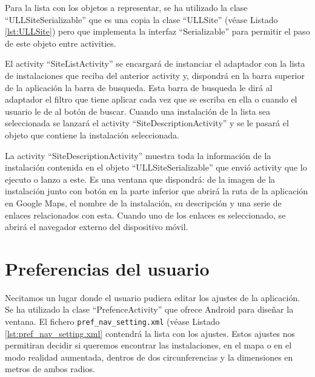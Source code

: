 

Para la lista con los objetos a representar, se ha utilizado la clase ``ULLSiteSerializable'' que es una copia la clase  ``ULLSite'' (véase Listado \ref{lst:ULLSite}) pero que implementa la interfaz ``Serializable'' para permitir el paso de este objeto entre activities. 

El activity ``SiteListActivity'' se encargará de instanciar el adaptador con la lista de instalaciones que reciba del anterior activity y, dispondrá en la barra superior de la aplicación la barra de busqueda. Esta barra de busqueda le dirá al adaptador el filtro que tiene aplicar cada vez que se escriba en ella o cuando el usuario le de al botón de buscar. Cuando una instalación de la lista sea seleccionada se lanzará el activity ``SiteDescriptionActivity'' y se le pasará el objeto que contiene la instalación seleccionada.


    

La activity ``SiteDescriptionActivity'' muestra toda la información de la instalación contenida en el objeto ``ULLSiteSerializable'' que envió activity que lo ejecuto o lanzo a este. Es una ventana que dispondrá: de la imagen de la instalación junto con botón en la parte inferior que abrirá la ruta de la aplicación en Google Maps, el nombre de la instalación, su descripción y una serie de enlaces relacionados con esta. Cuando uno de los enlaces es seleccionado, se abrirá el navegador externo del dispositivo móvil.

 

 
    
\section{Preferencias del usuario}

Necitamos un lugar donde el usuario pudiera editar los ajustes de la aplicación. Se ha utilizado la clase ``PrefenceActivity'' que ofrece Android para diseñar la ventana. El fichero \texttt{pref\_nav\_setting.xml} (véase Listado \ref{lst:pref_nav_setting.xml} contendrá la lista con los ajustes. Estos ajustes nos permitiran decidir si queremos encontrar las instalaciones, en el mapa o en el modo realidad aumentada, dentros de dos circunferencias y la dimensiones en metros de ambos radios. 

